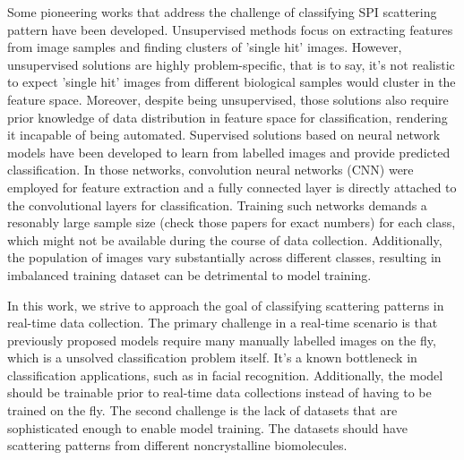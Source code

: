 Some pioneering works that address the challenge of classifying SPI scattering
pattern have been developed.  Unsupervised methods
\cite{yoonUnsupervisedClassificationSingleparticle2011,
giannakisSymmetriesImageFormation2012,schwanderSymmetriesImageFormation2012,
yoonNovelAlgorithmsCoherent2012,
andreassonAutomatedIdentificationClassification2014,
bobkovSortingAlgorithmsSingleparticle2015a} focus on extracting features from
image samples and finding clusters of 'single hit' images.  However,
unsupervised solutions are highly problem-specific, that is to say, it's not
realistic to expect 'single hit' images from different biological samples would
cluster in the feature space.  Moreover, despite being unsupervised, those
solutions also require prior knowledge of data distribution in feature space for
classification, rendering it incapable of being automated. Supervised solutions
based on neural network models \cite{shiEvaluationPerformanceClassification2019,
ignatenkoClassificationDiffractionPatterns2021} have been developed to learn
from labelled images and provide predicted classification.  In those networks,
convolution neural networks (CNN) were employed for feature extraction and a
fully connected layer is directly attached to the convolutional layers for
classification.  Training such networks demands a resonably large sample size
{\color{red}(check those papers for exact numbers)} for each class, which might
not be available during the course of data collection. Additionally, the
population of images vary substantially across different classes, resulting in
imbalanced training dataset can be detrimental to model training.  



In this work, we strive to approach the goal of classifying scattering patterns
in real-time data collection.  The primary challenge in a real-time scenario is
that previously proposed models require many manually labelled images on the fly,
which is a unsolved classification problem itself.  It's a known bottleneck in
classification applications, such as in facial recognition.  Additionally, the
model should be trainable prior to real-time data collections instead of having
to be trained on the fly. The second challenge is the lack of datasets that are
sophisticated enough to enable model training. The datasets should have
scattering patterns from different noncrystalline biomolecules.  



